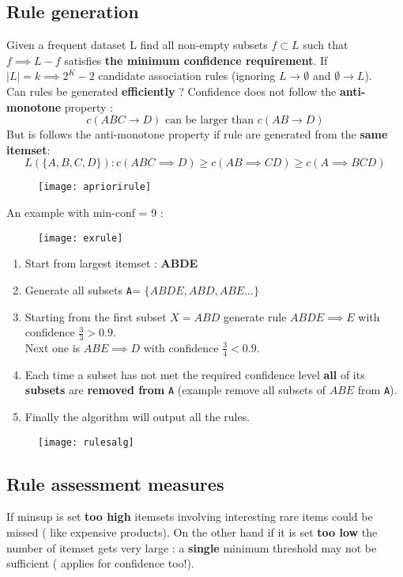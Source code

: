 \subsection{Rule generation}
Given a frequent dataset L find all non-empty subsets $f \subset L$ such that $f \implies L-f$ satisfies \textbf{the minimum confidence requirement}. If $|L| = k \implies 2^K-2$ candidate association rules (ignoring $L \rightarrow \emptyset$ and $\emptyset \rightarrow L$).\\
Can rules be generated \textbf{efficiently} ? Confidence does not follow the \textbf{anti-monotone} property : 
$$ c(ABC \rightarrow D) \text{ can be larger than } c(AB \rightarrow D)$$
But is follows the anti-monotone property if rule are generated from the \textbf{same	 itemset}:
$$ L(\{ A,B,C,D\}) : c(ABC \implies D) \geq c(AB \implies CD) \geq c(A \implies BCD)$$
 \begin{figure}[H]
  \centering
  \texttt{[image: apriorirule]}
\end{figure}
An example with min-conf = 9 :
 \begin{figure}[H]
  \centering
  \texttt{[image: exrule]}
\end{figure}
\begin{enumerate}
\item Start from largest itemset : \textbf{ABDE}
\item Generate all subsets \texttt{A}= $\{ ABDE, ABD,ABE...\}$
\item Starting from the first subset $X=ABD$ generate rule $ABDE \implies E$ with confidence $\frac{3}{3} > 0.9$.\\
Next one is $ABE \implies D$ with confidence $\frac{3}{4} < 0.9$.
\item Each time a subset has not met the required confidence level \textbf{all} of its \textbf{subsets} are \textbf{removed from} \texttt{A} (example remove all subsets of $ABE$ from \texttt{A}).
\item Finally the algorithm will output all the rules.
\end{enumerate}
 \begin{figure}[H]
  \centering
  \texttt{[image: rulesalg]}
\end{figure}

\subsection{Rule assessment measures}
If minsup is set \textbf{too high} itemsets involving interesting rare items could be missed ( like expensive products). On the other hand if it is set\textbf{ too low} the number of itemset gets very large : a \textbf{single} minimum threshold may not be sufficient ( applies for confidence too!).\\

